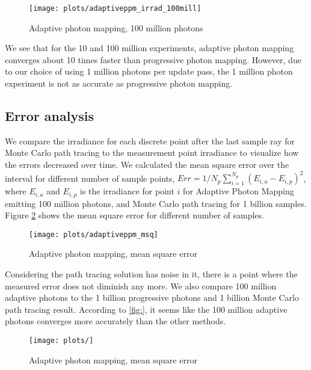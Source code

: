 \begin{figure}
    \centering
    \texttt{[image: plots/adaptiveppm\_irrad\_100mill]}\\
    \caption{Adaptive photon mapping, 100 million photons}
    \label{fig:adaptive_irrad100}
\end{figure}

We see that for the 10 and 100 million experiments, adaptive photon mapping converges about 10 times faster than progressive photon mapping. However, due to our choice of using 1 million photons per update pass, the 1 million photon experiment is not as accurate as progressive photon mapping.

\subsection*{Error analysis}
We compare the irradiance for each discrete point after the last sample ray for Monte Carlo path tracing to the measurement point irradiance to visualize how the errors decreased over time. We calculated the mean square error over the interval for different number of sample points, $Err = 1/N_p \sum_{i=1}^{N_p} (E_{i,a} - E_{i,p})^2$, where $E_{i,a}$ and $E_{i,p}$ is the irradiance for point $i$ for Adaptive Photon Mapping emitting 100 million photons, and Monte Carlo path tracing for 1 billion samples. Figure \ref{fig:adaptive_msq} shows the mean square error for different number of samples.

\begin{figure}
    \centering
    \texttt{[image: plots/adaptiveppm\_msq]}\\
    \caption{Adaptive photon mapping, mean square error}
    \label{fig:adaptive_msq}
\end{figure}

Considering the path tracing solution has noise in it, there is a point where the measured error does not diminish any more. We also compare 100 million adaptive photons to the 1 billion progressive photons and 1 billion Monte Carlo path tracing result. According to \ref{fig:}, it seems like the 100 million adaptive photons converges more accurately than the other methods. 

\begin{figure}
    \centering
    \texttt{[image: plots/]}\\
    \caption{Adaptive photon mapping, mean square error}
    \label{fig:adapative}
\end{figure}

